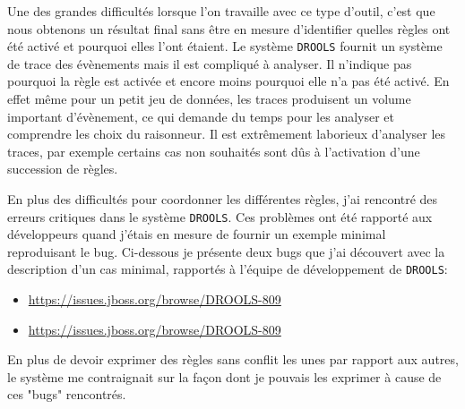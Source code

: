 \begin{refsegment}
Une des grandes difficultés lorsque l'on travaille avec ce type d'outil, c'est que nous obtenons un résultat final sans être en mesure d'identifier quelles règles ont été activé et pourquoi elles l'ont étaient. Le système \texttt{DROOLS} fournit un système de trace des évènements mais il est compliqué à analyser. Il n'indique pas pourquoi la règle est activée et encore moins pourquoi elle n'a pas été activé. En effet même pour un petit jeu de données, les traces produisent un volume important d'évènement, ce qui demande du temps pour les analyser et comprendre les choix du raisonneur. Il est extrêmement laborieux d'analyser les traces, par exemple certains cas non souhaités sont dûs à l'activation d'une succession de règles.

En plus des difficultés pour coordonner les différentes règles, j'ai rencontré des erreurs critiques dans le système \texttt{DROOLS}. Ces problèmes ont été rapporté aux développeurs quand j'étais en mesure de fournir un exemple minimal reproduisant le bug. Ci-dessous je présente deux bugs que j'ai découvert avec la description d'un cas minimal, rapportés à l'équipe de développement de \texttt{DROOLS}:
\begin{itemize}
	\item \url{https://issues.jboss.org/browse/DROOLS-809}
	\item \url{https://issues.jboss.org/browse/DROOLS-809}
\end{itemize}
 
En plus de devoir exprimer des règles sans conflit les unes par rapport aux autres, le système me contraignait sur la façon dont je pouvais les exprimer à cause de ces "bugs" rencontrés.


\end{refsegment}
